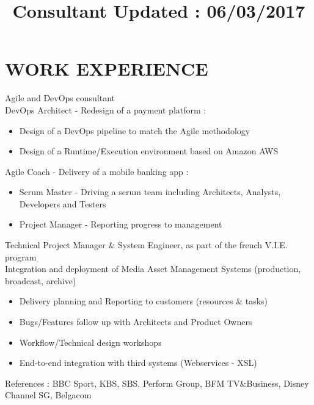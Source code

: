 \documentclass[11pt,a4paper]{moderncv}
\title{Consultant %
 \newline \newline \small{Updated : 06/03/2017} }                          %
\begin{document}
\maketitle




  
  
\section{WORK EXPERIENCE}
{}{Agile and DevOps consultant
\\DevOps Architect - Redesign of a payment platform :  
\begin{itemize}
\item Design of a DevOps pipeline to match the Agile methodology
\item Design of a Runtime/Execution environment based on Amazon AWS
\end{itemize}
Agile Coach - Delivery of a mobile banking app : 
\begin{itemize}
\item Scrum Master - Driving a scrum team including Architects, Analysts, Developers and Testers
\item Project Manager - Reporting progress to management
\end{itemize}
}{}{}
{}{Technical Project Manager \& System Engineer, as part of the french V.I.E. program
\\Integration and deployment of Media Asset Management Systems (production, broadcast, archive)
\begin{itemize}
\item Delivery planning and Reporting to customers (resources \& tasks)
\item Bugs/Features follow up with Architects and Product Owners
\item Workflow/Technical design workshops
\item End-to-end integration with third systems (Webservices - XSL) 
\end{itemize}
References : BBC Sport, KBS, SBS, Perform Group, BFM TV\&Business, Disney Channel SG, Belgacom 
}{}{}
\end{document}
